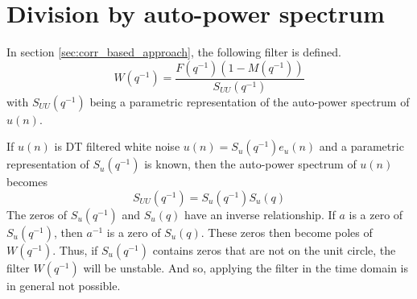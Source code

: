 \section{Division by auto-power spectrum}
\label{appendix:W_filtering}
In section \ref{sec:corr_based_approach}, the following filter is defined.
\begin{equation*}
    W(q^{-1}) = \frac{F(q^{-1})(1-M(q^{-1}))}{S_{UU}(q^{-1})}
\end{equation*}
with $S_{UU}(q^{-1})$ being a parametric representation of the auto-power spectrum of $u(n)$.

If $u(n)$ is DT filtered white noise $u(n) = S_u(q^{-1}) e_u(n)$ and a parametric representation of $S_u(q^{-1})$ is known, then the auto-power spectrum of $u(n)$ becomes
\begin{equation*}
    S_{UU}(q^{-1}) = S_u(q^{-1}) S_u(q)
\end{equation*}
The zeros of $S_u(q^{-1})$ and $S_u(q)$ have an inverse relationship. If $a$ is a zero of $S_u(q^{-1})$, then $a^{-1}$ is a zero of $S_u(q)$. These zeros then become poles of $W(q^{-1})$. Thus, if $S_u(q^{-1})$ contains zeros that are not on the unit circle, the filter $W(q^{-1})$ will be unstable. And so, applying the filter in the time domain is in general not possible.

\newpage
